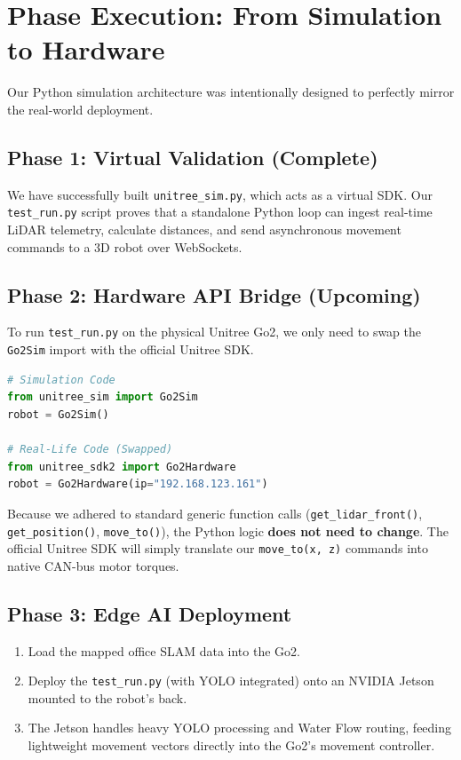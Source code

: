 \documentclass[12pt, a4paper]{article}
\begin{document}
\section{Phase Execution: From Simulation to Hardware}
Our Python simulation architecture was intentionally designed to perfectly mirror the real-world deployment.

\subsection{Phase 1: Virtual Validation (Complete)}
We have successfully built \texttt{unitree\_sim.py}, which acts as a virtual SDK. Our \texttt{test\_run.py} script proves that a standalone Python loop can ingest real-time LiDAR telemetry, calculate distances, and send asynchronous movement commands to a 3D robot over WebSockets.

\subsection{Phase 2: Hardware API Bridge (Upcoming)}
To run \texttt{test\_run.py} on the physical Unitree Go2, we only need to swap the \texttt{Go2Sim} import with the official Unitree SDK.

\begin{lstlisting}[language=Python, basicstyle=\ttfamily\small, frame=single, breaklines=true]
# Simulation Code
from unitree_sim import Go2Sim 
robot = Go2Sim()

# Real-Life Code (Swapped)
from unitree_sdk2 import Go2Hardware
robot = Go2Hardware(ip="192.168.123.161")
\end{lstlisting}

Because we adhered to standard generic function calls (\texttt{get\_lidar\_front()}, \texttt{get\_position()}, \texttt{move\_to()}), the Python logic \textbf{does not need to change}. The official Unitree SDK will simply translate our \texttt{move\_to(x, z)} commands into native CAN-bus motor torques.

\subsection{Phase 3: Edge AI Deployment}
\begin{enumerate}
    \item Load the mapped office SLAM data into the Go2.
    \item Deploy the \texttt{test\_run.py} (with YOLO integrated) onto an NVIDIA Jetson mounted to the robot's back.
    \item The Jetson handles heavy YOLO processing and Water Flow routing, feeding lightweight movement vectors directly into the Go2's movement controller.
\end{enumerate}
\end{document}
